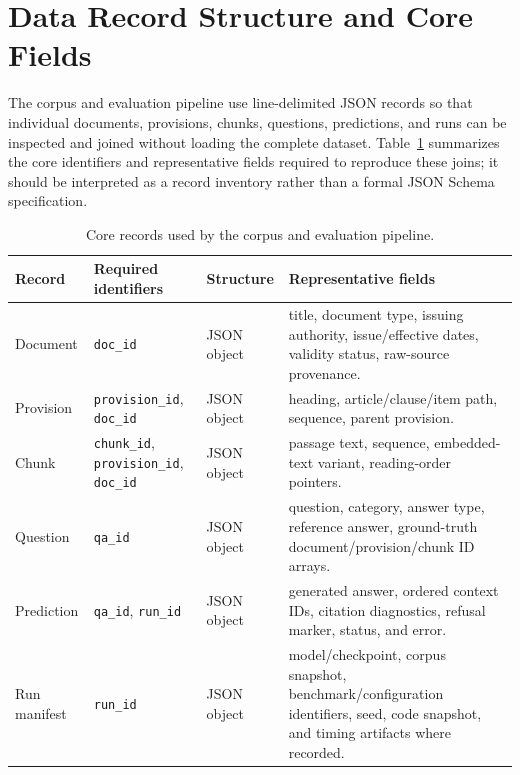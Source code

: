 \appendix
\section{Data Record Structure and Core Fields}
\label{app:data-record-structure}

The corpus and evaluation pipeline use line-delimited JSON records so that individual documents, provisions, chunks, questions, predictions, and runs can be inspected and joined without loading the complete dataset. Table~\ref{tab:data-record-structure} summarizes the core identifiers and representative fields required to reproduce these joins; it should be interpreted as a record inventory rather than a formal JSON Schema specification.
\begin{table}[t]
\centering
\scriptsize
\caption{Core records used by the corpus and evaluation pipeline.}
\label{tab:data-record-structure}

\begin{tabularx}{\textwidth}{@{}p{}p{}p{}X@{}}
\toprule
\textbf{Record} & \textbf{Required identifiers} & \textbf{Structure} & \textbf{Representative fields} \\
\midrule
Document
& \texttt{doc\_id}
& JSON object
& title, document type, issuing authority, issue/effective dates, validity status, raw-source provenance. \\

Provision
& \texttt{provision\_id}, \texttt{doc\_id}
& JSON object
& heading, article/clause/item path, sequence, parent provision. \\

Chunk
& \texttt{chunk\_id}, \texttt{provision\_id}, \texttt{doc\_id}
& JSON object
& passage text, sequence, embedded-text variant, reading-order pointers. \\

Question
& \texttt{qa\_id}
& JSON object
& question, category, answer type, reference answer, ground-truth document/provision/chunk ID arrays. \\

Prediction
& \texttt{qa\_id}, \texttt{run\_id}
& JSON object
& generated answer, ordered context IDs, citation diagnostics, refusal marker, status, and error. \\

Run manifest
& \texttt{run\_id}
& JSON object
& model/checkpoint, corpus snapshot, benchmark/configuration identifiers, seed, code snapshot, and timing artifacts where recorded. \\
\bottomrule
\end{tabularx}
\end{table}

